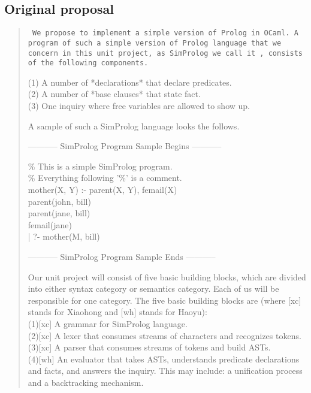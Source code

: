 \documentclass{article}
\begin{document}
\subsection*{Original proposal}
\begin{quote}
	\tt
	We propose to implement a simple version of Prolog
	in OCaml. A program of such a simple version of Prolog
	language that we concern in this unit project, as SimProlog 
	we call it , consists of the following components.
	
	(1) A number of *declarations* that declare predicates.\\
	(2) A number of *base clauses* that state fact.\\
	(3) One inquiry where free variables are allowed to show up.
	
	A sample of such a SimProlog language looks the follows.
	\begin{center}
		----------- SimProlog Program Sample Begins -----------
	\end{center}
	
	\% This is a simple SimProlog program.\\
	\% Everything following '\%' is a comment.\\
	
	mother(X, Y) :- parent(X, Y), femail(X)\\
	parent(john, bill)\\
	parent(jane, bill)\\
	femail(jane)\\
	| ?- mother(M, bill)
\begin{center}
		----------- SimProlog Program Sample Ends -----------
\end{center}
	
	Our unit project will consist of five basic building
	blocks, which are divided into either syntax category or
	semantics category. Each of us will be responsible for
	one category. The five basic building blocks are (where [xc] stands for Xiaohong and [wh] stands for Haoyu):\\
	(1)[xc] A grammar for SimProlog language.\\
	(2)[xc] A lexer that consumes streams of characters and
	recognizes tokens.\\
	(3)[xc] A parser that consumes streams of tokens and build
	ASTs.\\
	(4)[wh] An evaluator that takes ASTs, understands predicate
	declarations and facts, and answers the inquiry. This may
	include: a unification process and a backtracking mechanism.
\end{quote}
\end{document}
